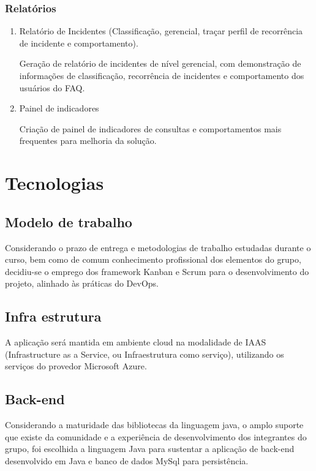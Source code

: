 \documentclass[
    12pt,               %
    openright,          %
    oneside,
    a4paper,            %
    MODELO,             %
    english,            %
    brazil              %
   ]{ifsp-spo-inf-ctds}
\begin{document}
\subsection{Relatórios}

	\begin{enumerate}

	\item Relatório de Incidentes (Classificação, gerencial, traçar perfil de recorrência de incidente e comportamento).
	
	Geração de relatório de incidentes de nível gerencial, com demonstração de informações de classificação, recorrência de incidentes e comportamento dos usuários do FAQ.
	
	\item Painel de indicadores
	
	Criação de painel de indicadores de consultas e comportamentos mais frequentes para melhoria da solução.

	\end{enumerate}
	
\chapter[Tecnologias]{Tecnologias}

\section{Modelo de trabalho}

Considerando o prazo de entrega e metodologias de trabalho estudadas durante o curso, bem como de comum conhecimento profissional dos elementos do grupo, decidiu-se o emprego dos framework Kanban e Scrum para o desenvolvimento do projeto, alinhado {\`a}s práticas do DevOps.

\section{Infra estrutura}

A aplica{\c{c}}ão será mantida em ambiente cloud na modalidade de IAAS (Infrastructure as a Service, ou Infraestrutura como servi{\c{c}}o), utilizando os servi{\c{c}}os do provedor Microsoft Azure.

\section{Back-end}

Considerando a maturidade das bibliotecas da linguagem java, o amplo suporte que existe da comunidade e a experiência de desenvolvimento dos integrantes do grupo, foi escolhida a linguagem Java para sustentar a aplica{\c{c}}ão de back-end desenvolvido em Java e banco de dados MySql para persistência.
\end{document}
